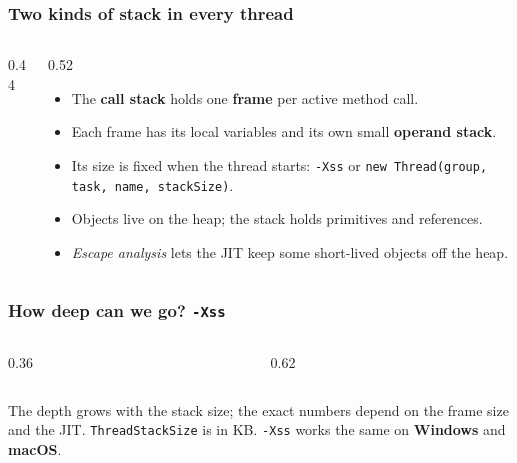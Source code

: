 \documentclass[aspectratio=169,10pt,compress]{beamer}
\newcommand{\win}{\textbf{Windows}}
\newcommand{\mac}{\textbf{macOS}}
\begin{document}
\begin{frame}[t,fragile] \frametitle{Two kinds of stack in every thread}
  \begin{columns}[T]
    \begin{column}{0.44\textwidth}
      \begin{center}
      \end{center}
    \end{column}
    \begin{column}{0.52\textwidth}
      \begin{itemize}\small
        \item The \textbf{call stack} holds one \textbf{frame} per active method call.
        \item Each frame has its local variables and its own small \textbf{operand stack}.
        \item Its size is fixed when the thread starts: \texttt{-Xss} or \texttt{new Thread(group, task, name, stackSize)}.
        \item Objects live on the heap; the stack holds primitives and references.
        \item \emph{Escape analysis} lets the JIT keep some short-lived objects off the heap.
      \end{itemize}
    \end{column}
  \end{columns}
\end{frame}




\begin{frame}[t,fragile] \frametitle{How deep can we go? \texttt{-Xss}}
  \begin{columns}[T]
    \begin{column}{0.36\textwidth}
    \end{column}
    \begin{column}{0.62\textwidth}
    \end{column}
  \end{columns}
  \small The depth grows with the stack size; the exact numbers depend on the frame size and the JIT. \texttt{ThreadStackSize} is in KB.
  \texttt{-Xss} works the same on \win{} and \mac.
\end{frame}
\end{document}
